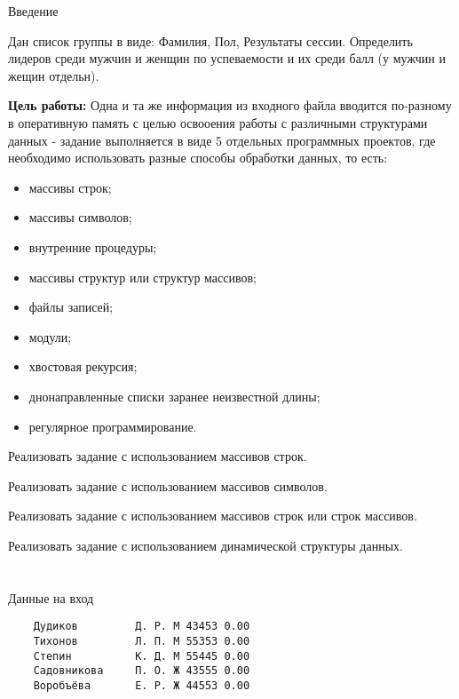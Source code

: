 \documentclass[a4paper,12pt]{extreport}
\begin{document}
\begin{center}
    Введение
\end{center}

Дан список группы в виде: Фамилия, Пол, Результаты сессии. Определить лидеров среди мужчин и женщин по успеваемости и их среди балл (у мужчин и жещин отдельн).

\textbf{Цель работы:} Одна и та же информация из входного файла вводится по-разному в оперативную память с целью освооения работы с различными структурами данных - задание выполняется в виде 5 отдельных программных проектов, где необходимо использовать разные способы обработки данных, то есть: 

\begin{itemize}
    \item массивы строк;
    \item массивы символов;
    \item внутренние процедуры;
    \item массивы структур или структур массивов;
    \item файлы записей;
    \item модули;
    \item хвостовая рекурсия;
    \item днонаправленные списки заранее неизвестной длины;
    \item регулярное программирование.
\end{itemize}

Реализовать задание с использованием массивов строк.

Реализовать задание с использованием массивов символов.

Реализовать задание с использованием массивов строк или строк массивов.

Реализовать задание с использованием динамической структуры данных.

\newpage

\chapter{}

\renewcommand{\labelenumii}{\arabic{enumi}.\arabic{enumii}.}

Данные на вход

\begin{verbatim}
    Дудиков         Д. Р. М 43453 0.00
    Тихонов         Л. П. М 55353 0.00
    Степин          К. Д. М 55445 0.00
    Садовникова     П. О. Ж 43555 0.00
    Воробъёва       Е. Р. Ж 44553 0.00
\end{verbatim}
\end{document}
